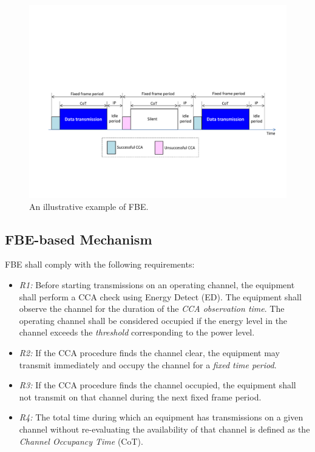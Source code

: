 \begin{itemize}
\begin{figure}[!t]
	\centering
	\includegraphics[width=0.9\columnwidth]{figures2/FBE-example}
	\caption{An illustrative example of FBE.}
	\label{figs:FBE-example}
\end{figure}


\subsection{FBE-based Mechanism}
\label{etsi-lbt:fbe}

FBE shall comply with the following requirements:

\begin{itemize}
	
	\item
	\textit{R1:} Before starting transmissions on an operating channel, the equipment shall perform a CCA check using Energy Detect (ED). The equipment shall observe the channel for the duration of the \textit{CCA observation time}. The operating channel shall be considered occupied if the energy level in the channel exceeds the \textit{threshold} corresponding to the power level.
	
	\item
	\textit{R2:}
	If the CCA procedure finds the channel clear, the equipment may transmit immediately and occupy the channel for a \textit{fixed time period}.
	
	\item
	\textit{R3:} If the CCA procedure finds the channel occupied, the equipment shall not transmit on that channel during the next fixed frame period.
	
	\item
	\textit{R4:} The total time during which an equipment has transmissions on a given channel without re-evaluating the availability of that channel is defined as the \textit{Channel Occupancy Time} (CoT).
	

\end{itemize}
\end{itemize}
